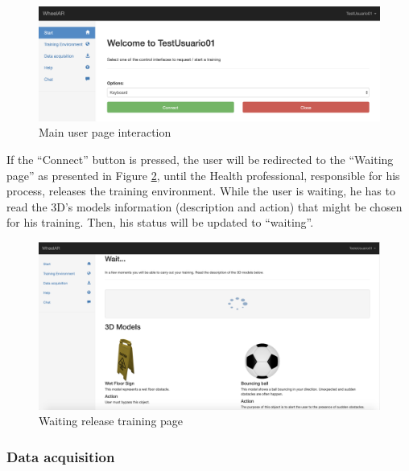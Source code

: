 \begin{figure}[!hbt]
\begin{center}
\includegraphics[width=1\linewidth]{img/apendiceD/tUserSession}
\caption{Main user page interaction} \label{fig:apDtUserSession}
\end{center}
\vspace{-15pt}
\end{figure}

If the ``Connect''  button is pressed, the user will be redirected to the ``Waiting page''  as presented in Figure \ref{fig:apDtWaitingSession}, until the Health professional, responsible for his process, releases the training environment. While the user is waiting, he has to read the 3D's models information (description and action) that might be chosen for his training. Then, his status will be updated to ``waiting''.

\begin{figure}[!hbt]
\begin{center}
\includegraphics[width=1\linewidth]{img/apendiceD/tWaitingSession}
\caption{Waiting release training page} \label{fig:apDtWaitingSession}
\end{center}
\vspace{-15pt}
\end{figure}


\subsubsection{Data acquisition} 


